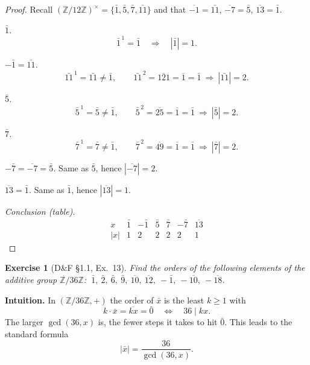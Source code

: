 \documentclass[12pt]{article}
\newtheorem{exercise}[theorem]{Exercise}
\theoremstyle{definition}
\begin{document}
\dotfill

\begin{proof}
Recall $(\mathbb{Z}/12\mathbb{Z})^{\times}=\{\bar 1,\bar 5,\bar 7,\bar{11}\}$ and that $\overline{-1}=\bar{11}$, $\overline{-7}=\bar 5$, $\overline{13}=\bar 1$.

\dotfill

\noindent
\emph{$\bar 1$.} 
\[
\bar 1^{\,1}=\bar 1 \quad\Rightarrow\quad |\bar 1|=1.
\]

\noindent
\emph{$-\bar 1=\bar{11}$.}
\[
\bar{11}^{\,1}=\bar{11}\neq\bar 1,\qquad
\bar{11}^{\,2}=\overline{121}=\overline{1}=\bar 1
\ \Rightarrow\ |\bar{11}|=2.
\]

\noindent
\emph{$\bar 5$.}
\[
\bar 5^{\,1}=\bar 5\neq\bar 1,\qquad
\bar 5^{\,2}=\overline{25}=\overline{1}=\bar 1
\ \Rightarrow\ |\bar 5|=2.
\]

\noindent
\emph{$\bar 7$.}
\[
\bar 7^{\,1}=\bar 7\neq\bar 1,\qquad
\bar 7^{\,2}=\overline{49}=\overline{1}=\bar 1
\ \Rightarrow\ |\bar 7|=2.
\]

\noindent
\emph{$-\bar 7=\overline{-7}=\bar 5$.}
Same as $\bar 5$, hence $|\overline{-7}|=2$.

\noindent
\emph{$\overline{13}=\bar 1$.}
Same as $\bar 1$, hence $|\overline{13}|=1$.

\dotfill

\noindent
\emph{Conclusion (table).}
\[
\begin{array}{c|cccccc}
x & \bar 1 & -\bar 1 & \bar 5 & \bar 7 & -\bar 7 & \overline{13} \\
\hline
|x| & 1 & 2 & 2 & 2 & 2 & 1
\end{array}
\]
\end{proof}

\newpage

\begin{exercise}[D\&F §1.1, Ex.~13]
Find the orders of the following elements of the additive group $\mathbb{Z}/36\mathbb{Z}$:
$\ \bar 1,\ \bar 2,\ \bar 6,\ \bar 9,\ \overline{10},\ \overline{12},\ -\bar 1,\ -\overline{10},\ -\overline{18}$.
\end{exercise}

\dotfill

\noindent
\textbf{Intuition.}
In $(\mathbb{Z}/36\mathbb{Z}, +)$ the order of $\bar x$ is the least $k\ge 1$ with
\[
k\cdot\bar x=\overline{kx}=\bar 0
\quad\Longleftrightarrow\quad
36\mid kx.
\]
The larger $\gcd(36,x)$ is, the fewer steps it takes to hit $\bar 0$. This leads to the standard formula
\[
|\bar x|=\frac{36}{\gcd(36,x)}.
\]
\end{document}
